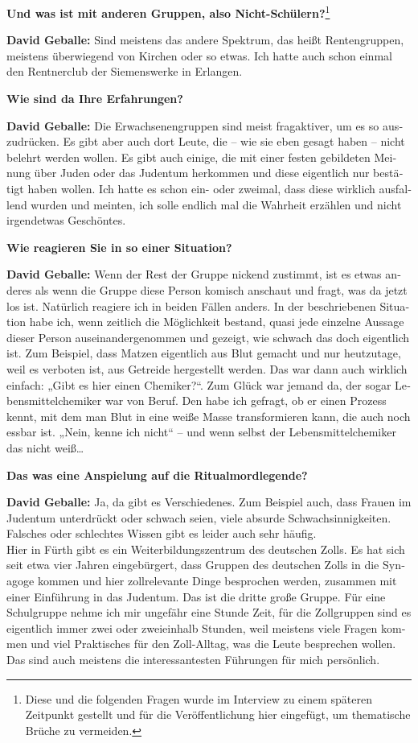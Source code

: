 \begin{otherlanguage}{ngerman}
\textbf{Und was ist mit anderen Gruppen, also Nicht-Schülern?}\footnote{Diese und die folgenden Fragen wurde im Interview zu einem späteren Zeitpunkt gestellt und für die Veröffentlichung hier eingefügt, um thematische Brüche zu vermeiden.} 

\textbf{David Geballe:} Sind meistens das andere Spektrum, das heißt Rentengruppen, meistens überwiegend von Kirchen oder so etwas. Ich hatte auch schon einmal den Rentnerclub der Siemenswerke in Erlangen.

\textbf{Wie sind da Ihre Erfahrungen?} 

\textbf{David Geballe:} Die Erwachsenengruppen sind meist fragaktiver, um es so auszudrücken. Es gibt aber auch dort Leute, die – wie sie eben gesagt haben – nicht belehrt werden wollen. Es gibt auch einige, die mit einer festen gebildeten Meinung über Juden oder das Judentum herkommen und diese eigentlich nur bestätigt haben wollen. Ich hatte es schon ein- oder zweimal, dass diese wirklich ausfallend wurden und meinten, ich solle endlich mal die Wahrheit erzählen und nicht irgendetwas Geschöntes. 

\textbf{Wie reagieren Sie in so einer Situation?} 

\textbf{David Geballe:} Wenn der Rest der Gruppe nickend zustimmt, ist es etwas anderes als wenn die Gruppe diese Person komisch anschaut und fragt, was da jetzt los ist. Natürlich reagiere ich in beiden Fällen anders. 
In der beschriebenen Situation habe ich, wenn zeitlich die Möglichkeit bestand, quasi jede einzelne Aussage dieser Person auseinandergenommen und gezeigt, wie schwach das doch eigentlich ist. Zum Beispiel, dass Matzen eigentlich aus Blut gemacht und nur heutzutage, weil es verboten ist, aus Getreide hergestellt werden. Das war dann auch wirklich einfach: „Gibt es hier einen Chemiker?“. Zum Glück war jemand da, der sogar Lebensmittelchemiker war von Beruf. Den habe ich gefragt, ob er einen Prozess kennt, mit dem man Blut in eine weiße Masse transformieren kann, die auch noch essbar ist. „Nein, kenne ich nicht“ – und wenn selbst der Lebensmittelchemiker das nicht weiß… 

\textbf{Das was eine Anspielung auf die Ritualmordlegende?} 

\textbf{David Geballe:} Ja, da gibt es Verschiedenes. Zum Beispiel auch, dass Frauen im Judentum unterdrückt oder schwach seien, viele absurde Schwachsinnigkeiten. Falsches oder schlechtes Wissen gibt es leider auch sehr häufig.\\
Hier in Fürth gibt es ein Weiterbildungszentrum des deutschen Zolls. Es hat sich seit etwa vier Jahren eingebürgert, dass Gruppen des deutschen Zolls in die Synagoge kommen und hier zollrelevante Dinge besprochen werden, zusammen mit einer Einführung in das Judentum. Das ist die dritte große Gruppe. Für eine Schulgruppe nehme ich mir ungefähr eine Stunde Zeit, für die Zollgruppen sind es eigentlich immer zwei oder zweieinhalb Stunden, weil meistens viele Fragen kommen und viel Praktisches für den Zoll-Alltag, was die Leute besprechen wollen. Das sind auch meistens die interessantesten Führungen für mich persönlich. 


\end{otherlanguage}
